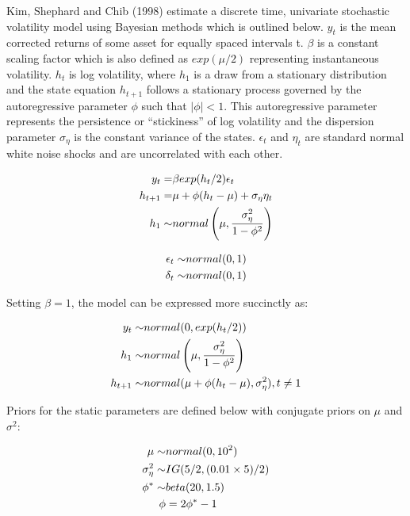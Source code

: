 \documentclass[
  12pt,
  letterpaper,
  DIV=11,
  numbers=noendperiod]{scrartcl}
\begin{document}
Kim, Shephard and Chib (1998) estimate a discrete time, univariate
stochastic volatility model using Bayesian methods which is outlined
below. \(y_t\) is the mean corrected returns of some asset for equally
spaced intervals t. \(\beta\) is a constant scaling factor which is also
defined as \(exp(\mu / 2)\) representing instantaneous volatility.
\(h_t\) is log volatility, where \(h_1\) is a draw from a stationary
distribution and the state equation \(h_{t+1}\) follows a stationary
process governed by the autoregressive parameter \(\phi\) such that
\(|\phi|<1\). This autoregressive parameter represents the persistence
or ``stickiness'' of log volatility and the dispersion parameter
\(\sigma_{\eta}\) is the constant variance of the states. \(\epsilon_t\)
and \(\eta_t\) are standard normal white noise shocks and are
uncorrelated with each other.

\[
\begin{aligned}
y_t =& \space \beta exp(h_t/2) \epsilon_t \\
h_{t+1} =& \space \mu +\phi(h_t - \mu) + \sigma_{\eta} \eta_t  \\
h_1 \sim& \space normal\left(\mu, \frac{\sigma_{\eta}^2}{1-\phi^2}\right) \\
\end{aligned}
\]

\[
\begin{aligned}
\epsilon_t \sim& \space normal(0,1) \\
\delta_t \sim& \space normal(0,1)
\end{aligned}
\]

Setting \(\beta=1\), the model can be expressed more succinctly as:

\[
\begin{aligned}
y_t \sim& \space normal(0, exp(h_t/2)) \\ 
h_1 \sim& \space normal \left(\mu, \frac{\sigma_{\eta}^2}{1-\phi^2}\right) \\
h_{t+1} \sim& \space normal(\mu +\phi(h_t - \mu) , \sigma_{\eta}^2), \space\space t\neq 1\\ 
\end{aligned}
\]

Priors for the static parameters are defined below with conjugate priors
on \(\mu\) and \(\sigma^2\):

\[
\begin{aligned}
\mu \sim& \space normal(0, 10^2) \\
\sigma_{\eta}^2 \sim& \space IG(5/2, (0.01\times 5) / 2) \\
\phi^{\ast} \sim& \space beta(20, 1.5) \\
\phi &=  2\phi^{\ast} - 1
\end{aligned}
\]
\end{document}
